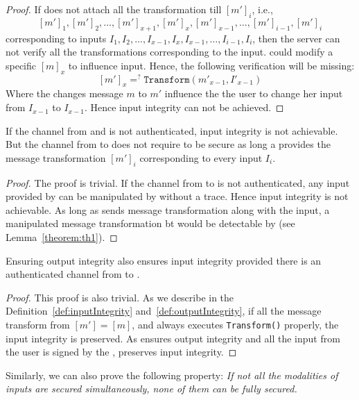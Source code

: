 \begin{proof}
If \user does not attach all the transformation till $[m']_i$, i.e., $$[m']_1, [m']_2, \ldots, [m']_{x+1}, [m']_x, [m']_{x-1}, \ldots, [m']_{i-1}, [m']_i$$  corresponding to inputs $I_1, I_2,\ldots, I_{x-1}, I_x, I_{x-1}, \ldots, I_{i-1}, I_i$, then the server can not verify all the transformations corresponding to the input. \host could modify a specific $[m]_x$ to influence \user input. Hence, the following verification will be missing:
$$[m']_x=^?\texttt{Transform}({m'}_{x-1}, I'_{x-1})$$
Where the \host changes message $m$ to $m'$ influence the the user to change her input from $I_{x-1}$ to $I_{x-1}$. Hence input integrity can not be achieved.
\end{proof}

\begin{lemma}
\label{theorem:th2}
If the channel from \user and \server is not authenticated, input integrity is not achievable. But the channel from \server to \user does not require to be secure as long a \user provides the message transformation $[m']_i$ corresponding to every input $I_i$.
\end{lemma}

\begin{proof}
The proof is trivial. If the channel from \user to \server is not authenticated, any input provided by \user can be manipulated by \host without a trace. Hence input integrity is not achievable. As long as \user sends message transformation along with the input, a manipulated message transformation bt \host would be detectable by \server (see Lemma~\ref{theorem:th1}).
\end{proof}

\begin{lemma}
\label{theorem:th3}
Ensuring output integrity also ensures input integrity provided there is an authenticated channel from \user to \server.
\end{lemma}

\begin{proof}
This proof is also trivial. As we describe in the Definition~\ref{def:inputIntegrity} and~\ref{def:outputIntegrity}, if all the message transform from \host $[m']=[m]$, and \host always executes \texttt{Transform()} properly, the input integrity is preserved. As \name ensures output integrity and all the input from the user is signed by the \device, \name preserves input integrity. 
\end{proof}


Similarly, we can also prove the following property: \emph{If not all the modalities of inputs are secured simultaneously, none of them can be fully secured.}

